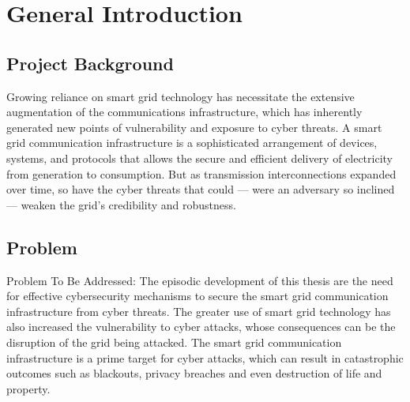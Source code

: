 \chapter*{General Introduction} 
\label{chap:introduction} 
%
%
%
%
%
%
%


\section*{Project Background}
Growing reliance on smart grid technology has necessitate the extensive augmentation of the communications infrastructure, which has inherently generated new points of vulnerability and exposure to cyber threats. A smart grid communication infrastructure is a sophisticated arrangement of devices, systems, and protocols that allows the secure and efficient delivery of electricity from generation to consumption. But as transmission interconnections expanded over time, so have the cyber threats that could — were an adversary so inclined — weaken the grid's credibility and robustness.



\section*{Problem}
Problem To Be Addressed: The episodic development of this thesis are the need for effective cybersecurity mechanisms to secure the smart grid communication infrastructure from cyber threats. The greater use of smart grid technology has also increased the vulnerability to cyber attacks, whose consequences can be the disruption of the grid being attacked. The smart grid communication infrastructure is a prime target for cyber attacks, which can result in catastrophic outcomes such as blackouts, privacy breaches and even destruction of life and property.




